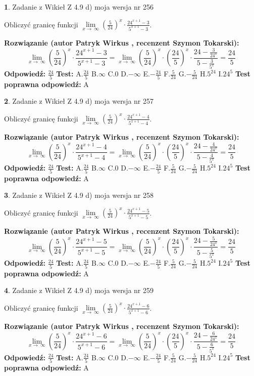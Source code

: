 \documentclass[12pt, a4paper]{article}
\theoremstyle{definition} %
\newtheorem{zad}{}
\newcommand{\zadStart}[1]{\begin{zad}#1\newline}
\newcommand{\zadStop}{\end{zad}}
\newcommand{\rozwStart}[2]{\noindent \textbf{Rozwiązanie (autor #1 , recenzent #2): }\newline}
\newcommand{\rozwStop}{\newline}
\newcommand{\odpStart}{\noindent \textbf{Odpowiedź:}\newline}
\newcommand{\odpStop}{\newline}
\newcommand{\testStart}{\noindent \textbf{Test:}\newline}
\newcommand{\testStop}{\newline}
\newcommand{\kluczStart}{\noindent \textbf{Test poprawna odpowiedź:}\newline}
\newcommand{\kluczStop}{\newline}
\begin{document}
\zadStart{Zadanie z Wikieł Z 4.9 d) moja wersja nr 256}


Obliczyć granicę funkcji  $\lim\limits_{x\to\ \infty}(\frac{5}{24})^{x}\cdot\frac{24^{x+1}-3}{5^{x+1}-3}$.
\zadStop
\rozwStart{Patryk Wirkus}{Szymon Tokarski}
$$\lim\limits_{x\to\ \infty}(\frac{5}{24})^{x}\cdot\frac{24^{x+1}-3}{5^{x+1}-3}=\lim\limits_{x\to\ \infty}(\frac{5}{24})^{x}\cdot(\frac{24}{5})^{x} \cdot \frac{24-\frac{3}{24^{x}}}{5-\frac{3}{5^{x}}} = \frac{24}{5}$$
\rozwStop
\odpStart
$\frac{24}{5}$
\odpStop
\testStart
A.$\frac{24}{5}$ B.$\infty$ C.$0$ D.$-\infty$ E.$-\frac{24}{5}$
F.$\frac{5}{24}$ G.$-\frac{5}{24}$
H.$5^{24}$
I.$24^{5}$
\testStop
\kluczStart
A
\kluczStop



\zadStart{Zadanie z Wikieł Z 4.9 d) moja wersja nr 257}


Obliczyć granicę funkcji  $\lim\limits_{x\to\ \infty}(\frac{5}{24})^{x}\cdot\frac{24^{x+1}-4}{5^{x+1}-4}$.
\zadStop
\rozwStart{Patryk Wirkus}{Szymon Tokarski}
$$\lim\limits_{x\to\ \infty}(\frac{5}{24})^{x}\cdot\frac{24^{x+1}-4}{5^{x+1}-4}=\lim\limits_{x\to\ \infty}(\frac{5}{24})^{x}\cdot(\frac{24}{5})^{x} \cdot \frac{24-\frac{4}{24^{x}}}{5-\frac{4}{5^{x}}} = \frac{24}{5}$$
\rozwStop
\odpStart
$\frac{24}{5}$
\odpStop
\testStart
A.$\frac{24}{5}$ B.$\infty$ C.$0$ D.$-\infty$ E.$-\frac{24}{5}$
F.$\frac{5}{24}$ G.$-\frac{5}{24}$
H.$5^{24}$
I.$24^{5}$
\testStop
\kluczStart
A
\kluczStop



\zadStart{Zadanie z Wikieł Z 4.9 d) moja wersja nr 258}


Obliczyć granicę funkcji  $\lim\limits_{x\to\ \infty}(\frac{5}{24})^{x}\cdot\frac{24^{x+1}-5}{5^{x+1}-5}$.
\zadStop
\rozwStart{Patryk Wirkus}{Szymon Tokarski}
$$\lim\limits_{x\to\ \infty}(\frac{5}{24})^{x}\cdot\frac{24^{x+1}-5}{5^{x+1}-5}=\lim\limits_{x\to\ \infty}(\frac{5}{24})^{x}\cdot(\frac{24}{5})^{x} \cdot \frac{24-\frac{5}{24^{x}}}{5-\frac{5}{5^{x}}} = \frac{24}{5}$$
\rozwStop
\odpStart
$\frac{24}{5}$
\odpStop
\testStart
A.$\frac{24}{5}$ B.$\infty$ C.$0$ D.$-\infty$ E.$-\frac{24}{5}$
F.$\frac{5}{24}$ G.$-\frac{5}{24}$
H.$5^{24}$
I.$24^{5}$
\testStop
\kluczStart
A
\kluczStop



\zadStart{Zadanie z Wikieł Z 4.9 d) moja wersja nr 259}


Obliczyć granicę funkcji  $\lim\limits_{x\to\ \infty}(\frac{5}{24})^{x}\cdot\frac{24^{x+1}-6}{5^{x+1}-6}$.
\zadStop
\rozwStart{Patryk Wirkus}{Szymon Tokarski}
$$\lim\limits_{x\to\ \infty}(\frac{5}{24})^{x}\cdot\frac{24^{x+1}-6}{5^{x+1}-6}=\lim\limits_{x\to\ \infty}(\frac{5}{24})^{x}\cdot(\frac{24}{5})^{x} \cdot \frac{24-\frac{6}{24^{x}}}{5-\frac{6}{5^{x}}} = \frac{24}{5}$$
\rozwStop
\odpStart
$\frac{24}{5}$
\odpStop
\testStart
A.$\frac{24}{5}$ B.$\infty$ C.$0$ D.$-\infty$ E.$-\frac{24}{5}$
F.$\frac{5}{24}$ G.$-\frac{5}{24}$
H.$5^{24}$
I.$24^{5}$
\testStop
\kluczStart
A
\kluczStop
\end{document}
